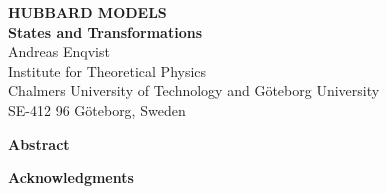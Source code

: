 \documentclass[a4paper,12pt,twoside,openright]{UGthesis}
\newcommand\ffam{\sffamily}
\newcommand\fser{\bfseries}
\newcommand\fsh{\upshape}
\newcommand\blankpage{\thispagestyle{empty}\mbox{}\newpage}
\begin{document}
%
%

\mbox{}\thispagestyle{empty}\newpage
\vspace*{165mm}


\blankpage

%
%

\thispagestyle{empty}
\begin{center}
        {\ffam
        {\fser\Large HUBBARD MODELS} \\[4mm]
        {\fser\large States and Transformations}\\[6mm]
        {\normalsize Andreas Enqvist  \\
        Institute for Theoretical Physics \\
        Chalmers University of Technology and G\"oteborg University \\
        SE-412 96 G\"oteborg, Sweden} \\[7mm]}
\end{center}

\centerline{\ffam\fser Abstract}
\medskip
\normalsize
\noindent


\vfill

\newpage



%
%
\thispagestyle{plain}
\vspace*{4cm}

\centerline{\ffam\fser\Large Acknowledgments}
\medskip
\smallskip

\normalsize
\noindent

%
%
\cleardoublepage
\tableofcontents
\pagestyle{empty}
\end{document}

